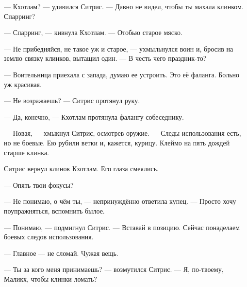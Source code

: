 --- Кхотлам? --- удивился Ситрис.
--- Давно не видел, чтобы ты махала клинком.
Спарринг?

--- Спарринг, — кивнула Кхотлам.
--- Отобью старое мяско.

--- Не прибедняйся, не такое уж и старое, --- ухмыльнулся воин и, бросив на землю связку клинков, вытащил один.
--- В честь чего праздник-то?

--- Воительница приехала с запада, думаю ее устроить.
Это её фаланга.
Больно уж красивая.

--- Не возражаешь? --- Ситрис протянул руку.

--- Да, конечно, --- Кхотлам протянула фалангу собеседнику.

--- Новая, --- хмыкнул Ситрис, осмотрев оружие.
--- Следы использования есть, но не боевые.
Ею рубили ветки и, кажется, курицу.
Клеймо на пять дождей старше клинка.

Ситрис вернул клинок Кхотлам.
Его глаза смеялись.

--- Опять твои фокусы?

--- Не понимаю, о чём ты, --- непринуждённо ответила купец.
--- Просто хочу поупражняться, вспомнить былое.

--- Понимаю, --- подмигнул Ситрис.
--- Вставай в позицию.
Сейчас понаделаем боевых следов использования.

--- Главное --- не сломай.
Чужая вещь.

--- Ты за кого меня принимаешь? --- возмутился Ситрис.
--- Я, по-твоему, Маликх, чтобы клинки ломать?


